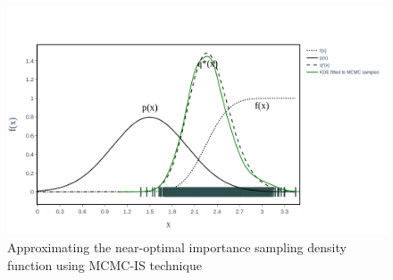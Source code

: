     \begin{figure}[H]
        \centering
        \includegraphics[scale=0.30]{Figures/Images/Illustrative Example/near_opt_IS_dist.png}
        \caption{Approximating the near-optimal importance sampling density function using MCMC-IS technique}
        \label{fig:near_opt_IS_dist}
    \end{figure}